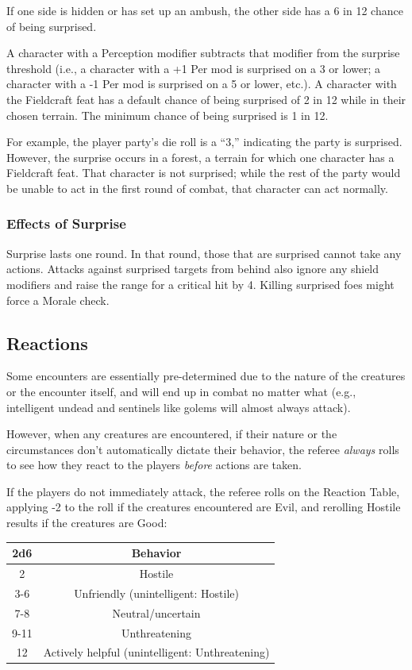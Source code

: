 \documentclass{book}
\begin{document}
If one side is hidden or has set up an ambush, the other side has a 6 in
12 chance of being surprised.

A character with a Perception modifier subtracts that modifier from the
surprise threshold (i.e., a character with a +1 Per mod is surprised on
a 3 or lower; a character with a -1 Per mod is surprised on a 5 or
lower, etc.). A character with the Fieldcraft feat has a default chance
of being surprised of 2 in 12 while in their chosen terrain. The minimum
chance of being surprised is 1 in 12.

For example, the player party's die roll is a ``3,'' indicating the
party is surprised. However, the surprise occurs in a forest, a terrain
for which one character has a Fieldcraft feat. That character is not
surprised; while the rest of the party would be unable to act in the
first round of combat, that character can act normally.

\subsubsection*{Effects of Surprise}\label{effects-of-surprise}

Surprise lasts one round. In that round, those that are surprised cannot
take any actions. Attacks against surprised targets from behind also
ignore any shield modifiers and raise the range for a critical hit by 4.
Killing surprised foes might force a Morale check.

\subsection*{Reactions}\label{reactions}

Some encounters are essentially pre-determined due to the nature of the
creatures or the encounter itself, and will end up in combat no matter
what (e.g., intelligent undead and sentinels like golems will almost
always attack).

However, when any creatures are encountered, if their nature or the
circumstances don't automatically dictate their behavior, the referee
\emph{always} rolls to see how they react to the players \emph{before}
actions are taken.

If the players do not immediately attack, the referee rolls on the
Reaction Table, applying -2 to the roll if the creatures encountered are
Evil, and rerolling Hostile results if the creatures are Good:

\begin{table}[H]
\centering
\begin{tabular}{cc}
    \toprule
        2d6 & Behavior \\
    \midrule
        2 & Hostile \\
        3-6 & Unfriendly (unintelligent: Hostile) \\
        7-8 & Neutral/uncertain \\
        9-11 & Unthreatening \\
        12 & Actively helpful (unintelligent: Unthreatening) \\
    \bottomrule
\end{tabular}
\end{table}
\end{document}
